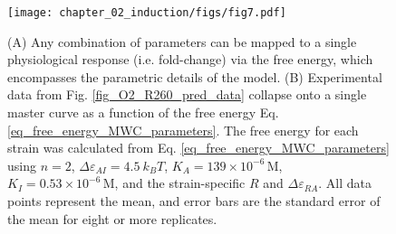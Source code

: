 \begin{figure}[ht]
	\centering \texttt{[image: chapter\_02\_induction/figs/fig7.pdf]}
	\caption[Fold-change data from a broad collection of different strains
		collapse onto a single master curve.]{(A) Any combination of
	parameters can be mapped to a single physiological response (i.e. fold-change)
	via the free energy, which encompasses the parametric details of the model.
	(B) Experimental data from Fig. \ref{fig_O2_R260_pred_data} collapse
	onto a single master curve as a function of the free energy
	Eq. \ref{eq_free_energy_MWC_parameters}. The free energy for each strain was
	calculated from Eq. \ref{eq_free_energy_MWC_parameters} using $n=2$,
	$\Delta\varepsilon_{AI}=4.5~k_BT$, $K_A=139 \times 10^{-6} \, \text{M}$,
	$K_I=0.53 \times 10^{-6}\, \text{M}$, and the strain-specific $R$ and
	$\Delta\varepsilon_{RA}$. All data points represent the mean, and error bars are
	the standard error of the mean for eight or more replicates.}
\label{fig_datacollapse}
\end{figure}